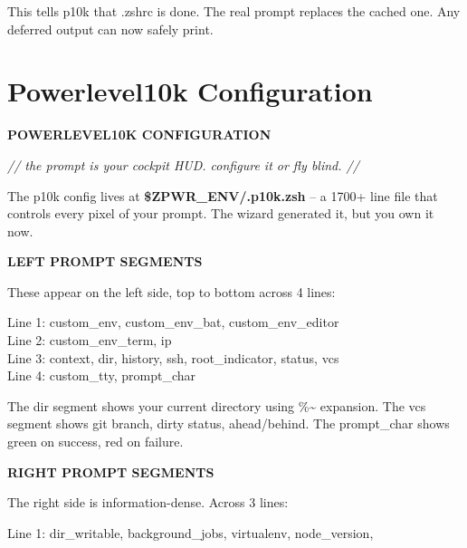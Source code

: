 \documentclass[11pt,a4paper,twoside]{book}
\begin{document}
This tells p10k that .zshrc is done. The real prompt replaces the cached one. Any deferred output can now safely print.


\vspace{16pt}

\section{Powerlevel10k Configuration}


\vspace{10pt}
{\large\bfseries\color{neoncyan} POWERLEVEL10K CONFIGURATION}\vspace{6pt}

{\small\itshape\color{dimtext} // the prompt is your cockpit HUD. configure it or fly blind. //}

The p10k config lives at \textbf{\$ZPWR\_ENV/.p10k.zsh} -- a 1700+ line file that controls every pixel of your prompt. The wizard generated it, but you own it now.


\vspace{12pt}
{\bfseries\color{neonyellow} LEFT \textbf{PROMPT} SEGMENTS}\vspace{4pt}

These appear on the left side, top to bottom across 4 lines:

\begin{codebox}
\color{neongreen}Line 1: custom\_env, custom\_env\_bat, custom\_env\_editor\\
\color{neongreen}Line 2: custom\_env\_term, ip\\
\color{neongreen}Line 3: context, dir, history, ssh, root\_indicator, status, vcs\\
\color{neongreen}Line 4: custom\_tty, prompt\_char\\
\end{codebox}

The dir segment shows your current directory using \%\textasciitilde{} expansion. The vcs segment shows git branch, dirty status, ahead/behind. The prompt\_char shows green on success, red on failure.


\vspace{12pt}
{\bfseries\color{neonyellow} RIGHT \textbf{PROMPT} SEGMENTS}\vspace{4pt}

The right side is information-dense. Across 3 lines:

\begin{codebox}
\color{neongreen}Line 1: dir\_writable, background\_jobs, virtualenv, node\_version,\\
\end{codebox}
\end{document}
